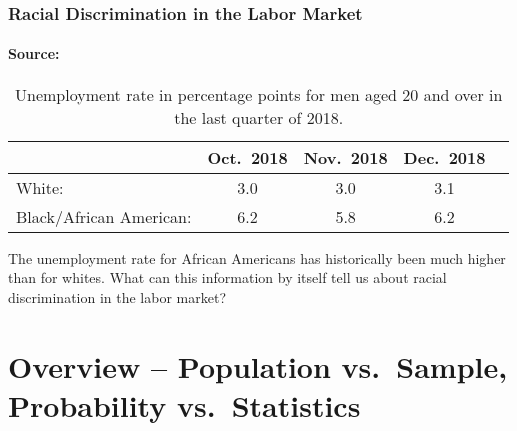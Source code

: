 
\begin{frame}[c]

  \frametitle{Racial Discrimination in the Labor Market}
  \framesubtitle{Source: \href{https://www.bls.gov/news.release/empsit.t02.htm}{}}

  \begin{table}
    \centering
    \begin{tabular}{lcccc}
      \hline
      & Oct.\ 2018 & Nov.\ 2018 & Dec.\ 2018 \\
      \hline
      White: & 3.0 & 3.0 & 3.1\\
      Black/African American: & 6.2 & 5.8 & 6.2\\
      \hline
    \end{tabular}
    \caption{Unemployment rate in percentage points for men aged 20 and over in the last quarter of 2018.}
  \end{table}

  \alert{The unemployment rate for African Americans has historically been much higher than for whites. What can this information by itself tell us about racial discrimination in the labor market?}
\end{frame}


%
%
%
%

\section{Overview -- Population vs.\ Sample, Probability vs.\ Statistics}

